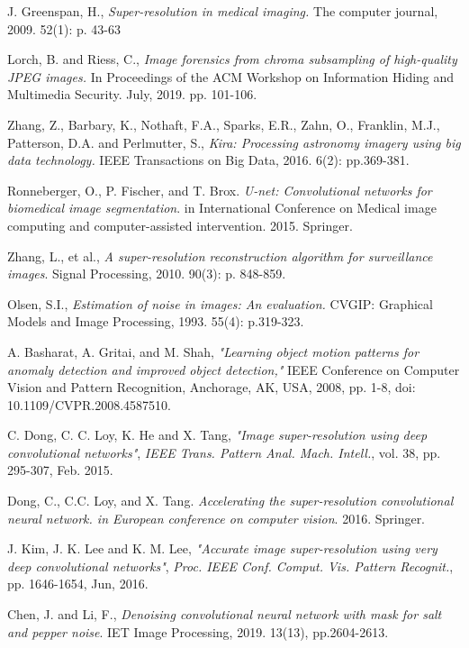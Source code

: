 \documentclass[twocolumn]{svjour3}          %
\begin{document}
\begin{thebibliography}{00}

 J. Greenspan, H., \textit{Super-resolution in medical imaging.} The computer journal, 2009. 52(1): p. 43-63

 Lorch, B. and Riess, C., \textit{Image forensics from chroma subsampling of high-quality JPEG images.} In Proceedings of the ACM Workshop on Information Hiding and Multimedia Security. July, 2019. pp. 101-106.

 Zhang, Z., Barbary, K., Nothaft, F.A., Sparks, E.R., Zahn, O., Franklin, M.J., Patterson, D.A. and Perlmutter, S.,  \textit{Kira: Processing astronomy imagery using big data technology.} IEEE Transactions on Big Data, 2016. 6(2): pp.369-381.

 Ronneberger, O., P. Fischer, and T. Brox. \textit{U-net: Convolutional networks for biomedical image segmentation}. in International Conference on Medical image computing and computer-assisted intervention. 2015. Springer.

 Zhang, L., et al., \textit{A super-resolution reconstruction algorithm for surveillance images}. Signal Processing, 2010. 90(3): p. 848-859.

 Olsen, S.I., \textit{Estimation of noise in images: An evaluation.} CVGIP: Graphical Models and Image Processing, 1993. 55(4):  p.319-323.

 A. Basharat, A. Gritai, and M. Shah, \textit{"Learning object motion patterns for anomaly detection and improved object detection,"} IEEE Conference on Computer Vision and Pattern Recognition, Anchorage, AK, USA, 2008, pp. 1-8, doi: 10.1109/CVPR.2008.4587510.

 C. Dong, C. C. Loy, K. He and X. Tang, \textit{"Image super-resolution using deep convolutional networks"}, \textit{IEEE Trans. Pattern Anal. Mach. Intell.}, vol. 38, pp. 295-307, Feb. 2015.

 Dong, C., C.C. Loy, and X. Tang. \textit{Accelerating the super-resolution convolutional neural network. in European conference on computer vision}. 2016. Springer.

 J. Kim, J. K. Lee and K. M. Lee, \textit{"Accurate image super-resolution using very deep convolutional networks"}, \textit{Proc. IEEE Conf. Comput. Vis. Pattern Recognit.}, pp. 1646-1654, Jun, 2016.

 Chen, J. and Li, F., \textit{Denoising convolutional neural network with mask for salt and pepper noise}. IET Image Processing, 2019. 13(13), pp.2604-2613.


\end{thebibliography}
\end{document}
